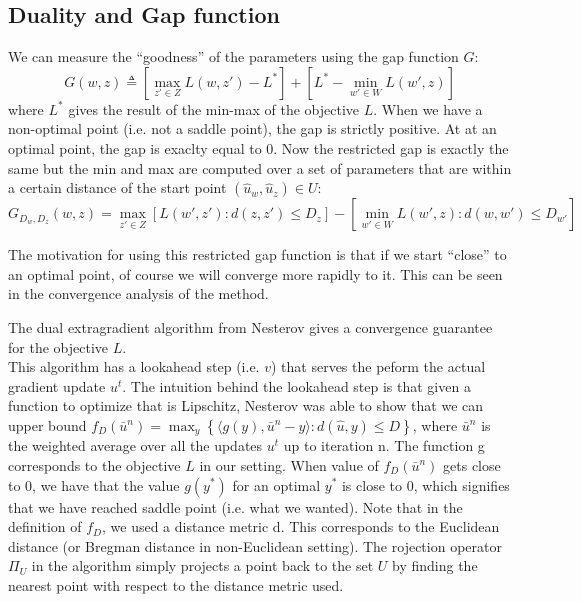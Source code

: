 \subsection{Duality and Gap function}
We can measure the ``goodness'' of the parameters using the gap function
${G}$:
\begin{equation}
  {G}( w,  z) \triangleq \left[ \max_{ z' \in {Z}}
{L}( w, z') - {L}^* \right] + \left[ {L}^* -
\min_{ w' \in {W}} {L}( w',  z) \right]
\end{equation}
where ${L}^*$ gives the result of the min-max of the objective
${L}$. When we have a non-optimal point (i.e. not a saddle point), the
gap is strictly positive. At at an optimal point, the gap is exaclty equal to 0.
Now the restricted gap is exactly the same but the min and max are computed over
a set of parameters that are within a certain distance of the start point
$(\hat{ u}_{ w},\hat{ u}_{ z}) \in {U}$:
\begin{equation}
  {G}_{D_{ w}, D_{ z}}( w,  z) = \max_{ z' \in
{Z}} \left[ {L}( w',  z') : d( z,  z') \leq
D_{ z} \right] - \left [ \min_{ w' \in {W}} {L}( w',
 z) : d( w,  w') \leq D_{ w'} \right ]
\end{equation}

The motivation for using this restricted gap function is that if we start
``close'' to an optimal point, of course we will converge more rapidly to it.
This can be seen in the convergence analysis of the method.

The dual extragradient algorithm from Nesterov gives a convergence guarantee for
the objective ${L}$.\\

This algorithm has a lookahead step (i.e. $v$) that serves the peform the actual
gradient update $u^t$. The intuition behind the lookahead step is that given a
function to optimize that is Lipschitz, Nesterov was able to show that we can
upper bound $f_{D}(\bar{u}^n) = \max_y \left \{ \langle g(y),\bar{u}^n - y
\rangle : d(\hat{u},y) \leq D \right \}$, where $\bar{u}^n$ is the weighted
average over all the updates $u^t$ up to iteration n. The function g corresponds
to the objective ${L}$ in our setting. When value of $f_D(\bar{u}^n)$ gets close
to 0, we have that the value $g(y^*)$ for an optimal $y^*$ is close to 0, which
signifies that we have reached saddle point (i.e. what we wanted). Note that in
the definition of $f_D$, we used a
distance metric d. This corresponds to the Euclidean distance (or Bregman
distance in non-Euclidean setting). The rojection operator $\Pi_{{U}}$ in the
algorithm simply projects a point back to the set ${U}$ by finding the nearest
point with respect to the distance metric used.

